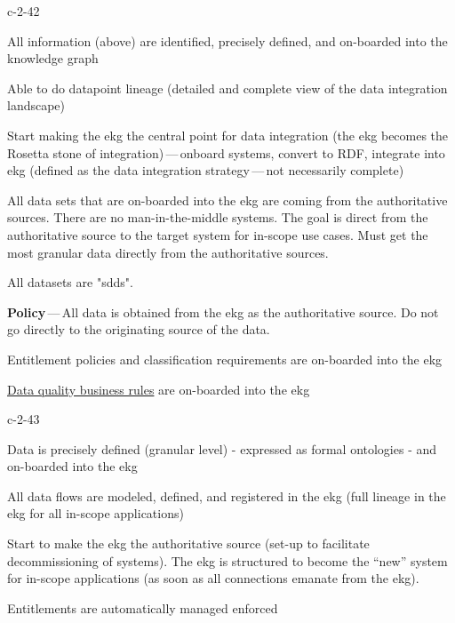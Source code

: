 \begin{level-assessment}{c-2-4}{2}

    \item All information (above) are identified, precisely defined, and on-boarded into the knowledge graph
    \item Able to do datapoint lineage (detailed and complete view of the data integration landscape)
    \item Start making the \gls{ekg} the central point for data integration (the \gls{ekg} becomes the Rosetta stone of
          integration)\,---\,onboard systems, convert to RDF, integrate into \gls{ekg} (defined as the
          data integration strategy\,---\,not necessarily complete)
    \item All data sets that are on-boarded into the \gls{ekg} are coming from the authoritative sources.
          There are no man-in-the-middle systems.
          The goal is direct from the authoritative source to the target system for in-scope use cases.
          Must get the most granular data directly from the authoritative sources.
    \item All datasets are "\glspl{sdd}".
    \item \textbf{Policy}\,---\,All data is obtained from the \gls{ekg} as the authoritative source.
          Do not go directly to the originating source of the data.
    \item Entitlement policies and classification requirements are on-boarded into the \gls{ekg}
    \item \hyperref[sec:ekg-mm-data-quality-business-rules]{Data quality business rules}
          are on-boarded into the \gls{ekg}

\end{level-assessment}

\begin{level-assessment}{c-2-4}{3}

    \item Data is precisely defined (granular level) - expressed as formal ontologies - and on-boarded into the \gls{ekg}
    \item All data flows are modeled, defined, and registered in the \gls{ekg} (full lineage in the \gls{ekg} for all
          in-scope applications)
    \item Start to make the \gls{ekg} the authoritative source (set-up to facilitate decommissioning of systems).
          The \gls{ekg} is structured to become the “new” system for in-scope applications (as soon as all
          connections emanate from the \gls{ekg}).
    \item Entitlements are automatically managed enforced

\end{level-assessment}

